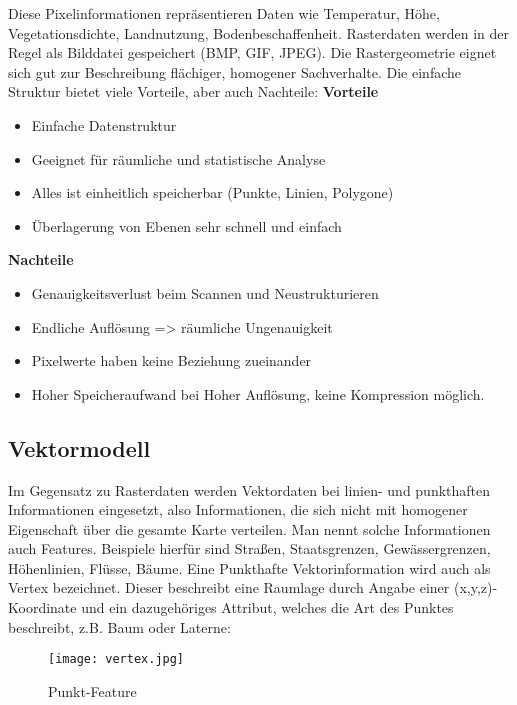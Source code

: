 \documentclass[11pt,ceqn]{book}
\begin{document}
Diese Pixelinformationen repräsentieren Daten wie  Temperatur, Höhe, Vegetationsdichte, Landnutzung, Bodenbeschaffenheit. Rasterdaten werden in der Regel als Bilddatei gespeichert (BMP, GIF, JPEG).
\newline
Die Rastergeometrie eignet sich gut zur Beschreibung flächiger, homogener Sachverhalte. Die einfache Struktur bietet viele Vorteile, aber auch Nachteile: \newline
\textbf{Vorteile}
\begin{itemize}
\item Einfache Datenstruktur 
\item Geeignet für räumliche und statistische Analyse
\item Alles ist einheitlich speicherbar (Punkte, Linien, Polygone)
\item Überlagerung von Ebenen sehr schnell und einfach
\end{itemize}
\textbf{Nachteile}
\begin{itemize}
\item Genauigkeitsverlust beim Scannen und Neustrukturieren
\item Endliche Auflösung => räumliche Ungenauigkeit
\item Pixelwerte haben keine Beziehung zueinander
\item Hoher Speicheraufwand bei Hoher Auflösung, keine Kompression möglich.
\end{itemize}

\subsection{Vektormodell}
Im Gegensatz zu Rasterdaten werden Vektordaten bei linien- und punkthaften Informationen eingesetzt, also Informationen, die sich nicht mit homogener Eigenschaft über die gesamte Karte verteilen. Man nennt solche Informationen auch Features. Beispiele hierfür sind Straßen, Staatsgrenzen, Gewässergrenzen, Höhenlinien, Flüsse, Bäume.
\newline
Eine Punkthafte Vektorinformation wird auch als Vertex bezeichnet. Dieser beschreibt eine Raumlage durch Angabe einer (x,y,z)-Koordinate und ein dazugehöriges Attribut, welches die Art des Punktes beschreibt, z.B. Baum oder Laterne:

\begin{figure}[H]
\centering
\texttt{[image: vertex.jpg]}
\caption{Punkt-Feature \protect\footnotemark}
\end{figure}
\end{document}
